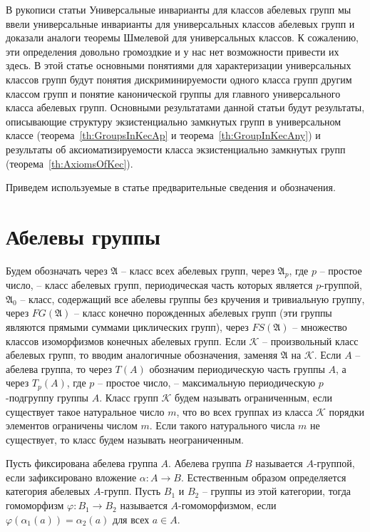 \documentclass[12pt]{extarticle} %
\def\A{{\mathfrak{A}}}
\def\K{{\mathcal{K}}}
\begin{document}
В рукописи статьи \flqq{}Универсальные инварианты для классов абелевых групп\frqq{} мы ввели универсальные инварианты для универсальных классов абелевых групп и доказали аналоги теоремы Шмелевой для универсальных классов. К сожалению, эти определения довольно громоздкие и у нас нет возможности привести их здесь. В этой статье основными понятиями для характеризации универсальных классов групп будут понятия дискриминируемости одного класса групп другим классом групп и понятие канонической группы для главного универсального класса абелевых групп. Основными результатами данной статьи будут результаты, описывающие  структуру экзистенциально замкнутых групп в универсальном классе (теорема~\ref{th:GroupsInKecAp} и теорема~\ref{th:GroupInKecAny}) и результаты об аксиоматизируемости класса экзистенциально замкнутых групп (теорема~\ref{th:AxiomsOfKec}).

Приведем используемые в статье предварительные сведения и обозначения.

\section{Абелевы группы}
Будем обозначать через $\A$ -- класс всех абелевых групп, через $\A_p$, где $p$ -- простое число, -- класс абелевых групп, периодическая часть которых является $p$-группой, $\A_0$ -- класс, содержащий все абелевы группы без кручения и тривиальную группу, через $FG(\A)$ -- класс конечно порожденных абелевых групп (эти группы являются прямыми суммами циклических групп), через $FS(\A)$ -- множество классов изоморфизмов конечных абелевых групп. Если $\K$ -- произвольный класс абелевых групп, то вводим аналогичные обозначения, заменяя $\A$ на $\K$. Если $A$ -- абелева группа, то через $T(A)$ обозначим периодическую часть группы $A$, а через $T_p(A)$, где $p$ -- простое число, -- максимальную периодическую $p$-подгруппу группы $A$. Класс групп $\K$ будем называть ограниченным, если существует такое натуральное число $m$, что во всех группах из класса $\K$ порядки элементов ограничены числом $m$. Если такого натурального числа $m$ не существует, то класс будем называть неограниченным.

Пусть фиксирована абелева группа $A$. Абелева группа $B$ называется $A$-группой, если зафиксировано вложение $\alpha: A \rightarrow B$. Естественным образом определяется категория абелевых $A$-групп. Пусть $B_1$ и $B_2$ -- группы из этой категории, тогда гомоморфизм $\varphi: B_1 \rightarrow B_2$ называется $A$-гомоморфизмом, если $\varphi(\alpha_1(a)) = \alpha_2(a)$ для всех $a \in A$.
\end{document}
